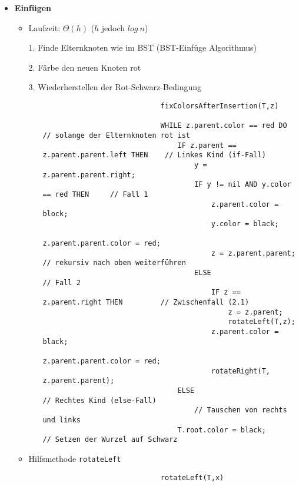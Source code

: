 \begin{itemize}
        \item \textbf{Einfügen}
            \begin{itemize}
                \item Laufzeit: $\Theta(h)$ ($h$ jedoch $log~n$)
                \item[1.] Finde Elternknoten wie im BST (BST-Einfüge Algorithmus)
                \item[2.] Färbe den neuen Knoten rot
                \item[3.] Wiederherstellen der Rot-Schwarz-Bedingung
                    \begin{itemize}
                        \item[]
                            \begin{verbatim}
                            fixColorsAfterInsertion(T,z)

                            WHILE z.parent.color == red DO                  // solange der Elternknoten rot ist
                                IF z.parent == z.parent.parent.left THEN    // Linkes Kind (if-Fall)
                                    y = z.parent.parent.right;
                                    IF y != nil AND y.color == red THEN     // Fall 1
                                        z.parent.color = block;
                                        y.color = black;
                                        z.parent.parent.color = red;
                                        z = z.parent.parent;                // rekursiv nach oben weiterführen
                                    ELSE                                    // Fall 2
                                        IF z == z.parent.right THEN         // Zwischenfall (2.1)
                                            z = z.parent;
                                            rotateLeft(T,z);
                                        z.parent.color = black;
                                        z.parent.parent.color = red;
                                        rotateRight(T, z.parent.parent);
                                ELSE                                        // Rechtes Kind (else-Fall)
                                    // Tauschen von rechts und links
                                T.root.color = black;                       // Setzen der Wurzel auf Schwarz
                            \end{verbatim}
                    \end{itemize}
                \item Hilfsmethode \texttt{rotateLeft}
                    \begin{itemize}
                        \item[] 
                            \begin{verbatim}
                            rotateLeft(T,x)
                            

\end{verbatim}
\end{itemize}
\end{itemize}
\end{itemize}
